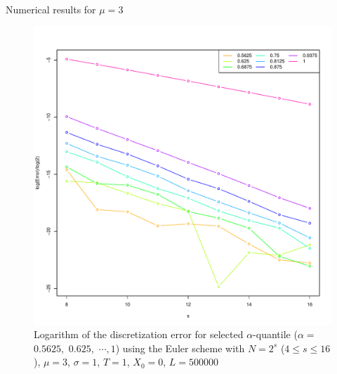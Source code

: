 \documentclass[cjk,10pt]{beamer}
\begin{document}
\begin{frame}{Numerical results for $\mu=3$}
\begin{figure}[p]
   \centering
   \includegraphics[scale=0.3]{nout_4_25_3log.pdf} %
   \caption{Logarithm of the discretization error for selected $\alpha$-quantile ($\alpha =$ $0.5625,$ $0.625,$  $\cdots, 1$) using the Euler scheme with $N = 2^s$ ($4\le s \le 16$), $\mu=3$, $\sigma=1$, $T=1$, $X_0=0$, $L=500000$}
   \label{f:lerr3}
\end{figure}
\end{frame}
\end{document}
